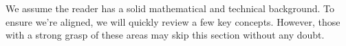 We assume the reader has a solid mathematical and technical background. To ensure we're aligned, 
we will quickly review a few key concepts.  However, those with a strong grasp of these areas may 
skip this section without any doubt.
